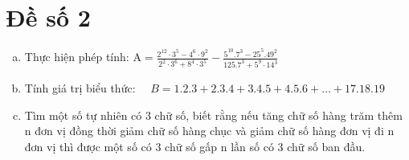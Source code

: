 \onehalfspacing
\section{Đề số 2}
\graphicspath{{./img/}}
\begin{bt} 
    \hfill
    \begin{enumerate}[a.]
        \item Thực hiện phép tính: $\mathrm{A}=\frac{2^{12} \cdot 3^5-4^6 \cdot 9^2}{2^2 \cdot 3^6+8^4 \cdot 3^5}-\frac{5^{10} .7^3-25^5 .49^2}{125.7^3+5^9 \cdot 14^3}$
        \item Tính giá trị biểu thức: $\quad B=1.2 .3+2.3 .4+3.4 .5+4.5 .6+\ldots+17.18 .19$
        \item Tìm một số tự nhiên có 3 chữ số, biết rằng nếu tăng chữ số hàng trăm thêm $\mathrm{n}$ đơn vị đồng thời giảm chữ số hàng chục và giảm chữ số hàng đơn vị đi n đơn vị thì được một số có 3 chữ số gấp n lần số có 3 chữ số ban đầu.
    \end{enumerate}
\end{bt}
